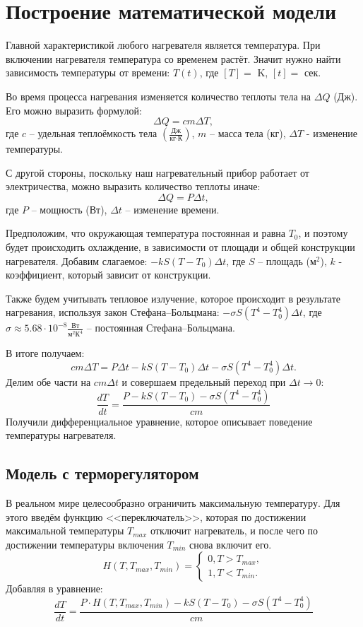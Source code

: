 \section{Построение математической модели}
    Главной характеристикой любого нагревателя является температура. При включении нагревателя температура со временем растёт. Значит нужно найти зависимость температуры от времени: $ T(t) $, где $[T] = $ K, $ [t] =$ сек.

    Во время процесса нагревания изменяется количество теплоты тела на $ \Delta Q $ (Дж). Его можно выразить формулой:
    \[
        \Delta Q = cm \Delta T,
    \]
    где $c$ -- удельная теплоёмкость тела $\left(\frac{\text{Дж}}{\text{кг} \cdot \text{К}}\right)$, $m$ -- масса тела (кг), $ \Delta T $ - изменение температуры.

    С другой стороны, поскольку наш нагревательный прибор работает от электричества, можно выразить количество теплоты иначе:
    \[
        \Delta Q = P \Delta t,
    \]
    где $P$ -- мощность (Вт), $\Delta t$ -- изменение времени. 

    Предположим, что окружающая температура постоянная и равна $T_0$, и поэтому будет происходить охлаждение, в зависимости от площади и общей конструкции нагревателя. Добавим слагаемое: $ -k S (T - T_0) \Delta t $, где $S$ -- площадь ($\text{м}^2$), $k$ - коэффициент, который зависит от конструкции.

    Также будем учитывать тепловое излучение, которое происходит в результате нагревания, используя закон Стефана--Больцмана: $ -\sigma S (T^4 - T_0^4) \Delta t $, где $\sigma \approx 5.68 \cdot 10^{-8} \frac{\text{Вт}}{\text{м}^2 \text{К}^4}$ -- постоянная Стефана--Больцмана.

    В итоге получаем:
    \[
        cm\Delta T = P \Delta t - k S (T - T_0) \Delta t - \sigma S (T^4 - T_0^4) \Delta t.
    \]
    Делим обе части на $ cm \Delta t $ и совершаем предельный переход при $ \Delta t \to 0 $:
    \[
        \frac{dT}{dt} = \frac{ P - k S (T - T_0) - \sigma S (T^4 - T_0^4) }{cm}
    \]
    Получили дифференциальное уравнение, которое описывает поведение температуры нагревателя.

    \subsection{Модель с терморегулятором}
    В реальном мире целесообразно ограничить максимальную температуру. Для этого введём функцию <<переключатель>>, которая по достижении максимальной температуры $ T_{max} $ отключит нагреватель, и после чего по достижении температуры включения $ T_{min} $ снова включит его.
    \[
        H(T, T_{max}, T_{min}) = \left\lbrace \begin{matrix}
            0, T > T_{max},\\
            1, T < T_{min}.
        \end{matrix}\right.
    \]
    Добавляя в уравнение:
    \[
        \frac{dT}{dt} = \frac{ P \cdot H(T, T_{max}, T_{min}) - k S (T - T_0) - \sigma S (T^4 - T_0^4) }{cm}
    \]